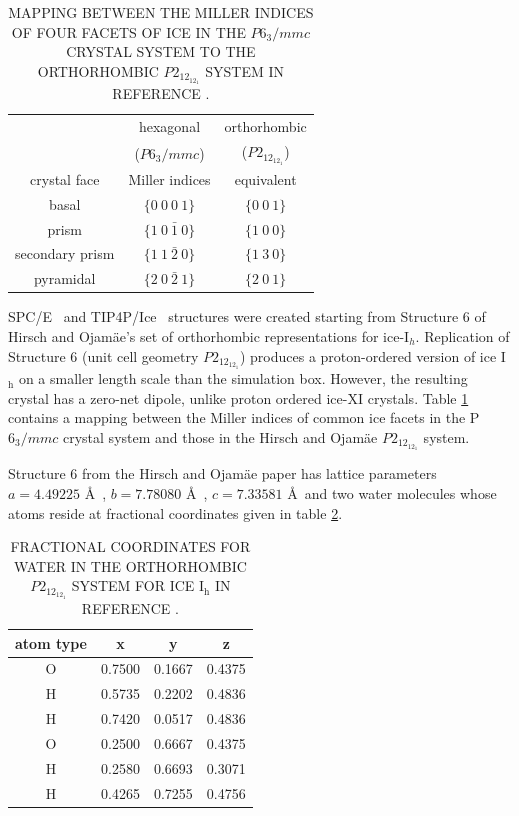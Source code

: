\begin{table}[h]
\centering
  \caption{MAPPING BETWEEN THE MILLER INDICES OF FOUR FACETS OF ICE IN
    THE $P6_3/mmc$ CRYSTAL SYSTEM TO THE ORTHORHOMBIC $P2_12_12_1$
    SYSTEM IN REFERENCE  \protect\citep{Hirsch04}.}
\label{tab:equiv}
\begin{tabular}{|ccc|} \hline
 & hexagonal & orthorhombic \\
 & ($P6_3/mmc$) & ($P2_12_12_1$) \\
 crystal face  & Miller indices & equivalent \\ \hline
basal & $\{0~0~0~1\}$ & $\{0~0~1\}$ \\
prism & $\{1~0~\bar{1}~0\}$ & $\{1~0~0\}$ \\
secondary prism & $\{1~1~\bar{2}~0\}$ & $\{1~3~0\}$ \\
pyramidal & $\{2~0~\bar{2}~1\}$ & $\{2~0~1\}$ \\ \hline
\end{tabular}
\end{table}

SPC/E~\cite{Berendsen1987} and TIP4P/Ice~\cite{Abascal2005} structures
were created starting from Structure 6 of Hirsch and Ojam\"{a}e's set
of orthorhombic representations for ice-I$_{h}$.\cite{Hirsch2004}
Replication of Structure 6 (unit cell geometry $P2_12_12_1$) produces a proton-ordered
version of ice I$_\mathrm{h}$ on a smaller length scale than the
simulation box. However, the resulting crystal has a zero-net dipole,
unlike proton ordered ice-XI crystals. Table \ref{tab:equiv} contains a
mapping between the Miller indices of common ice facets in the
P$6_3/mmc$ crystal system and those in the Hirsch and Ojam\"{a}e
$P2_12_12_1$ system.

Structure 6 from the Hirsch and Ojam\"{a}e paper has lattice
parameters $a = 4.49225$ \AA\ , $b = 7.78080$ \AA\ , $c = 7.33581$
\AA\ and two water molecules whose atoms reside at fractional
coordinates given in table
\ref{tab:p212121}. 

\begin{table}[h]
\centering
  \caption{FRACTIONAL COORDINATES FOR WATER IN THE ORTHORHOMBIC
    $P2_12_12_1$ SYSTEM FOR ICE I$_\mathrm{h}$ IN REFERENCE  \protect\citep{Hirsch0404}.}
\label{tab:p212121}
\begin{tabular}{|cccc|}  \hline
atom type & x & y & z \\ \hline
 O & 0.7500 & 0.1667 & 0.4375 \\
 H & 0.5735 & 0.2202 & 0.4836 \\
 H & 0.7420 & 0.0517 & 0.4836 \\
 O & 0.2500 & 0.6667 & 0.4375 \\
 H & 0.2580 & 0.6693 & 0.3071 \\
 H & 0.4265 & 0.7255 & 0.4756 \\ \hline
\end{tabular}
\end{table}


